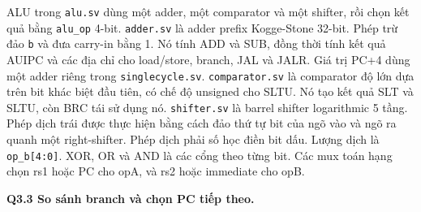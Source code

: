 \documentclass[10pt,a4paper]{article}
\newcommand{\code}[1]{\texttt{#1}}
\newcommand{\bw}[3][above right]{%
  \draw[thin] ($(#2)+(-0.07,-0.11)$) -- ($(#2)+(0.07,0.11)$);
  \node[font=\tiny,inner sep=1pt,#1] at (#2) {#3};}
\begin{document}
\begin{center}
{}
\end{center}

ALU trong \code{alu.sv} dùng một adder, một comparator và một shifter, rồi
chọn kết quả bằng \code{alu\_op} 4-bit. \code{adder.sv} là adder prefix
Kogge-Stone 32-bit. Phép trừ đảo \code{b} và đưa carry-in bằng 1. Nó tính
ADD và SUB, đồng thời tính kết quả AUIPC và các địa chỉ cho load/store,
branch, JAL và JALR. Giá trị PC+4 dùng một adder riêng trong
\code{singlecycle.sv}. \code{comparator.sv} là comparator độ lớn dựa trên
bit khác biệt đầu tiên, có chế độ unsigned cho SLTU. Nó tạo kết quả SLT và
SLTU, còn BRC tái sử dụng nó. \code{shifter.sv} là barrel shifter
logarithmic 5 tầng. Phép dịch trái được thực hiện bằng cách đảo thứ tự bit
của ngõ vào và ngõ ra quanh một right-shifter. Phép dịch phải số học điền
bit dấu. Lượng dịch là \code{op\_b[4:0]}. XOR, OR và AND là các cổng theo
từng bit. Các mux toán hạng chọn rs1 hoặc PC cho opA, và rs2 hoặc immediate
cho opB.

\textbf{Q3.3 So sánh branch và chọn PC tiếp theo.}
\end{document}
